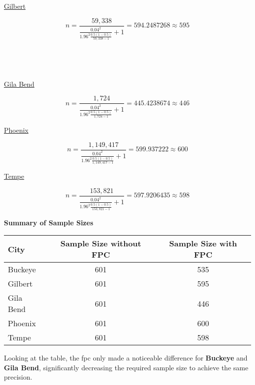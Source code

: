 \documentclass[12pt]{article}
\begin{document}
\ul{Gilbert}

\[
n = \frac{59,338}{\frac{0.04^2}{{1.96^2}\frac{0.5(1-0.5)}{59,338-1}} + 1} = 594.2487268 \approx \boxed{595}
\]
\\
\\
\\
\\
\ul{Gila Bend}

\[
n = \frac{1,724}{\frac{0.04^2}{{1.96^2}\frac{0.5(1-0.5)}{1,724-1}} + 1} = 445.4238674 \approx \boxed{446}
\]

\ul{Phoenix}

\[
n = \frac{1,149,417}{\frac{0.04^2}{{1.96^2}\frac{0.5(1-0.5)}{1,149,417-1}} + 1} = 599.937222 \approx \boxed{600}
\]

\ul{Tempe}

\[
n = \frac{153,821}{\frac{0.04^2}{{1.96^2}\frac{0.5(1-0.5)}{153,821-1}} + 1} = 597.9206435 \approx \boxed{598}
\]

\textbf{Summary of Sample Sizes}

\begin{longtable}[]{@{}lcc@{}}
\toprule\noalign{}
City & Sample Size without FPC & Sample Size with FPC \\
\midrule\noalign{}
\endhead
\bottomrule\noalign{}
\endlastfoot
Buckeye & 601 & 535 \\
Gilbert & 601 & 595 \\
Gila Bend & 601 & 446 \\
Phoenix & 601 & 600 \\
Tempe & 601 & 598 \\
\end{longtable}

Looking at the table, the fpc only made a noticeable difference for
\textbf{Buckeye} and \textbf{Gila Bend}, significantly decreasing the
required sample size to achieve the same precision.

\newpage
\end{document}
